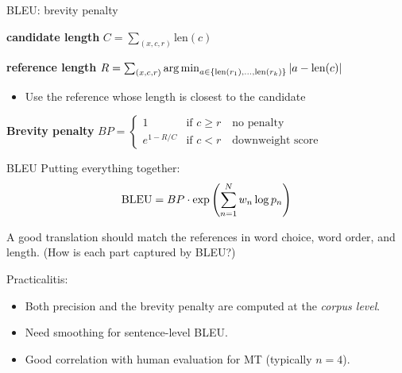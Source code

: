 \documentclass[usenames,dvipsnames,notes,11pt,aspectratio=169,hyperref={colorlinks=true, linkcolor=blue}]{beamer}
\begin{document}
\begin{frame}
    {BLEU: brevity penalty}


    \textbf{candidate length} $C=\sum_{(x,c,r)} \text{len}(c)$

    \textbf{reference length} $R=\sum_{(x,c,r)} \operatorname*{arg\,min}_{a\in\left\{ \text{len}(r_1),\ldots,\text{len}(r_k) \right\}} |a-\text{len}(c)|$\\
    \begin{itemize}
        \item Use the reference whose length is closest to the candidate
    \end{itemize}

    \textbf{Brevity penalty} $BP =
    \begin{cases}
        1 & \text{if } c \ge r \quad \text{no penalty}\\
        e^{1-R/C} & \text{if } c < r \quad \text{downweight score}
    \end{cases}
    $
\end{frame}

\begin{frame}
    {BLEU}
    Putting everything together:
    \begin{align*}
        \text{BLEU} &= BP\cdot \exp\left( \sum_{n=1}^N w_n \log p_n \right) \\
    \end{align*}
    \vspace{-2em}

    \pause
    A good translation should match the references in word choice, word order, and length. (How is each part captured by BLEU?)

    \pause
    Practicalitis:\\
    \begin{itemize}
        \item Both precision and the brevity penalty are computed at the \emph{corpus level}.
        \item Need smoothing for sentence-level BLEU.
        \item Good correlation with human evaluation for MT (typically $n=4$).
    \end{itemize}
\end{frame}
\end{document}
